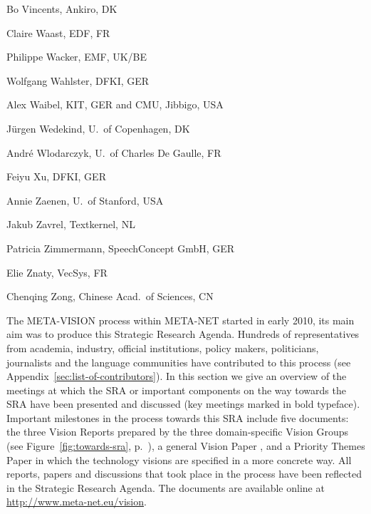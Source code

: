 \documentclass[10pt, plain]{../../metanetpaper}
\begin{document}
\begin{multicols}{3}
\begin{footnotesize}
\begin{enumerate}
{      \item Bo Vincents, Ankiro, DK
      \item Claire Waast, EDF, FR
      \item Philippe Wacker, EMF, UK/BE
      \item Wolfgang Wahlster, DFKI, GER
      \item Alex Waibel, KIT, GER and CMU, Jibbigo, USA
      \item Jürgen Wedekind, U.~of Copenhagen, DK
      \item André Wlodarczyk, U.~of Charles De Gaulle, FR
      \item Feiyu Xu, DFKI, GER
      \item Annie Zaenen, U.~of Stanford, USA
      \item Jakub Zavrel, Textkernel, NL
      \item Patricia Zimmermann, SpeechConcept GmbH, GER
      \item Elie Znaty, VecSys, FR
      \item Chenqing Zong, Chinese Acad.~of Sciences, CN
    }
  \end{enumerate}
\end{footnotesize}
\end{multicols}
  
\clearpage


\label{vision-evolution}

\begin{small}
The META-VISION process within META-NET started in early 2010, its main aim was to produce this Strategic Research Agenda. Hundreds of representatives from academia, industry, official institutions, policy makers, politicians, journalists and the language communities have contributed to this process (see Appendix~\ref{sec:list-of-contributors}). In this section we give an overview of the meetings at which the SRA or important components on the way towards the SRA have been presented and discussed (key meetings marked in bold typeface). 
%
Important milestones in the process towards this SRA include five documents: the three Vision Reports prepared by the three domain-specific Vision Groups (see Figure~\ref{fig:towards-sra}, p.~\pageref{fig:towards-sra}), a general Vision Paper \cite{Meta1}, and a Priority Themes Paper \cite{LT2020} in which the technology visions are specified in a more concrete way. All reports, papers and discussions that took place in the process have been reflected in the Strategic Research Agenda. The documents are available online at \url{http://www.meta-net.eu/vision}.
\end{small}
\end{document}
